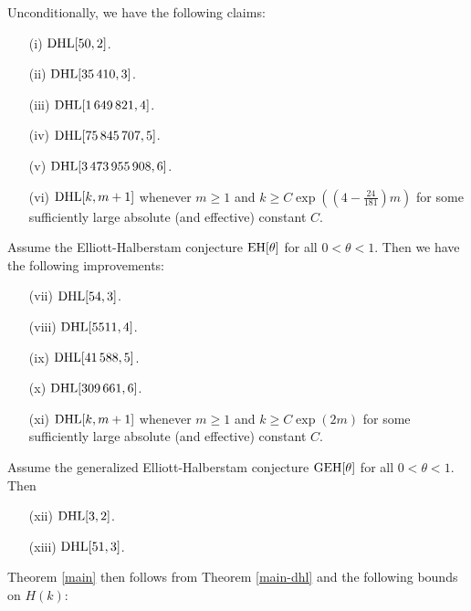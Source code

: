 \begin{theorem}\label{main-dhl} Unconditionally, we have the following claims:
\begin{itemize}
\item[(i)] $\operatorname*{DHL}[50,2]$.
\item[(ii)] $\operatorname*{DHL}[\num{35410},3]$.
\item[(iii)] $\operatorname*{DHL}[\num{1649821},4]$.
\item[(iv)] $\operatorname*{DHL}[\num{75845707},5]$.
\item[(v)] $\operatorname*{DHL}[\num{3473955908},6]$.
\item[(vi)] $\operatorname*{DHL}[k,m+1]$ whenever $m \geq 1$ and $k \geq C\exp( (4 - \frac{24}{181}) m )$ for some sufficiently large absolute (and effective) constant $C$.
\end{itemize}
Assume the Elliott-Halberstam conjecture $\operatorname*{EH}[\theta]$ for all $0 < \theta < 1$.  Then we have the following improvements:
\begin{itemize}
\item[(vii)] $\operatorname*{DHL}[54,3]$.
\item[(viii)] $\operatorname*{DHL}[\num{5511},4]$.
\item[(ix)] $\operatorname*{DHL}[\num{41588},5]$.
\item[(x)] $\operatorname*{DHL}[\num{309661},6]$.
\item[(xi)] $\operatorname*{DHL}[k,m+1]$ whenever $m \geq 1$ and $k \geq C\exp( 2 m )$ for some sufficiently large absolute (and effective) constant $C$.
\end{itemize}
Assume the generalized Elliott-Halberstam conjecture $\operatorname*{GEH}[\theta]$ for all $0 < \theta < 1$.  Then
\begin{itemize}
\item[(xii)] $\operatorname*{DHL}[3,2]$.
\item[(xiii)] $\operatorname*{DHL}[51,3]$.
\end{itemize}
\end{theorem}

Theorem \ref{main} then follows from Theorem \ref{main-dhl} and the following bounds on $H(k)$:

